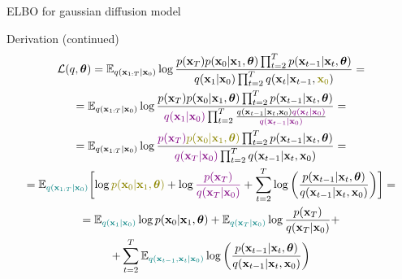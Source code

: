 \begin{frame}{ELBO for gaussian diffusion model}
	\begin{block}{Derivation (continued)}
		\vspace{-0.7cm}
		{\small
		\begin{multline*}
			\cL(q, \btheta) = \bbE_{q(\bx_{1:T} | \bx_0)} \log \frac{p(\bx_T) p(\bx_0 | \bx_1, \btheta) \prod_{t=2}^T p(\bx_{t-1} | \bx_t, \btheta) }{q(\bx_1 | \bx_0)\prod_{t=2}^T q(\bx_t | \bx_{t-1}, {\color{olive}\bx_0})}  = \\ 
			= \bbE_{q(\bx_{1:T} | \bx_0)} \log \frac{p(\bx_T) p(\bx_0 | \bx_1, \btheta) \prod_{t=2}^T p(\bx_{t-1} | \bx_t, \btheta) }{{\color{violet}q(\bx_1 | \bx_0)}\prod_{t=2}^T \frac{q(\bx_{t-1}|\bx_t, \bx_0) {\color{violet}q(\bx_{t} | \bx_0)}}{{\color{violet}q(\bx_{t-1}| \bx_0)}}}  = \\
			= \bbE_{q(\bx_{1:T} | \bx_0)} \log \frac{{\color{violet}p(\bx_T)} {\color{olive}p(\bx_0 | \bx_1, \btheta)} \prod_{t=2}^T p(\bx_{t-1} | \bx_t, \btheta) }{{\color{violet}q(\bx_T | \bx_0)}\prod_{t=2}^T q(\bx_{t-1}|\bx_t, \bx_0)}  = \\
			= \bbE_{{\color{teal}q(\bx_{1:T} | \bx_0)}} \biggl[ \log {\color{olive}p(\bx_0 | \bx_1, \btheta)} + \log {\color{violet}\frac{p(\bx_T)}{q(\bx_T | \bx_0)}} + \sum_{t=2}^T \log \left( \frac{p(\bx_{t-1} | \bx_t, \btheta)}{q(\bx_{t-1}|\bx_{t}, \bx_0)}\right) \biggr] = \\
			 = \bbE_{{\color{teal}q(\bx_1 | \bx_0)}} \log p(\bx_0 | \bx_1, \btheta) + \bbE_{{\color{teal}q(\bx_T | \bx_0)}} \log \frac{p(\bx_T)}{q(\bx_T | \bx_0)} + \\
			  + \sum_{t=2}^T \bbE_{{\color{teal}q(\bx_{t-1}, \bx_t | \bx_0)}} \log \left( \frac{p(\bx_{t-1} | \bx_t, \btheta)}{q(\bx_{t-1}|\bx_{t}, \bx_0)}\right) 
		\end{multline*}
		}
		\vspace{-0.3cm}
	\end{block}
\end{frame}
